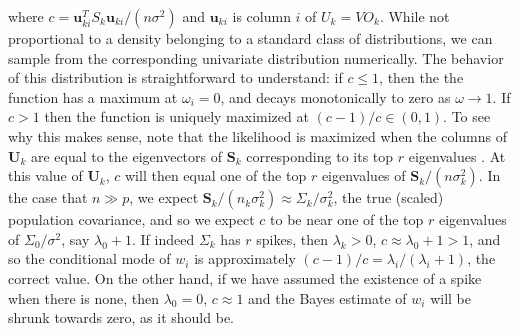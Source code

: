 \documentclass{article}
\newcommand{\bl}[1]{{\mathbf #1}}
\newcommand{\etr}{\text{etr}}
\begin{document}
where $c = \bl u_{ki}^T S_k \bl u_{ki}/(n \sigma^2)$ and $\bl u_{ki}$ is
column $i$ of $U_k = VO_k$.  While not proportional to a density
belonging to a standard class of distributions, we can sample from the
corresponding univariate distribution numerically.  The behavior of
this distribution is straightforward to understand: if $c\leq 1$, then
the the function has a maximum at $\omega_i =0$, and decays
monotonically to zero as $\omega \rightarrow 1$.  If $c>1$ then the
function is uniquely maximized at $(c-1)/c \in (0,1)$.  To see why
this makes sense, note that the likelihood is maximized when the
columns of $\bl U_k$ are equal to the eigenvectors of $\bl S_k$
corresponding to its top $r$ eigenvalues
\citep{Tipping1999}. At this value of $\bl U_k$, $c$ will then
equal one of the top $r$ eigenvalues of $\bl S_k/(n\sigma_k^2)$.  In the
case that $n\gg p$, we expect
$\bl S_k/(n_k\sigma_k^2)\approx \Sigma_k/\sigma_k^2$, the true (scaled)
population covariance, and so we expect $c$ to be near one of the top
$r$ eigenvalues of $\Sigma_0/\sigma^2$, say $\lambda_0+1$.  If indeed
$\Sigma_k$ has $r$ spikes, then $\lambda_k>0$,
$c \approx \lambda_0 +1 > 1$, and so the conditional mode of $w_i$ is
approximately $(c-1)/c = \lambda_i/(\lambda_i+1)$, the correct value.
On the other hand, if we have assumed the existence of a spike when
there is none, then $\lambda_0=0$, $c\approx 1$ and the Bayes estimate
of $w_i$ will be shrunk towards zero, as it should be.






\end{document}
